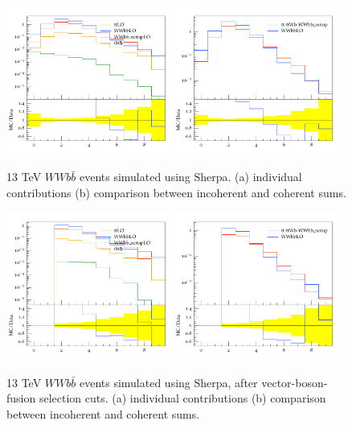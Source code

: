 \documentclass[11pt]{cernrep}
\begin{document}
\begin{figure}
\centering
	\includegraphics[width=0.48\textwidth]{WBF_njets_before_contribs.pdf}
	\includegraphics[width=0.48\textwidth]{WBF_njets_before.pdf}
\caption{\label{fig:wbf_before}
13 TeV $WWb\bar{b}$ events simulated using Sherpa. (a) individual contributions (b) comparison between incoherent and coherent sums.}
\end{figure}

\begin{figure}
\centering
	\includegraphics[width=0.48\textwidth]{WBF_njets_after_contribs.pdf}
	\includegraphics[width=0.48\textwidth]{WBF_njets_after.pdf}
\caption{\label{fig:wbf_after}
13 TeV $WWb\bar{b}$ events simulated using Sherpa, after vector-boson-fusion selection cuts. 
(a) individual contributions (b) comparison between incoherent and coherent sums.}
\end{figure}
\end{document}
